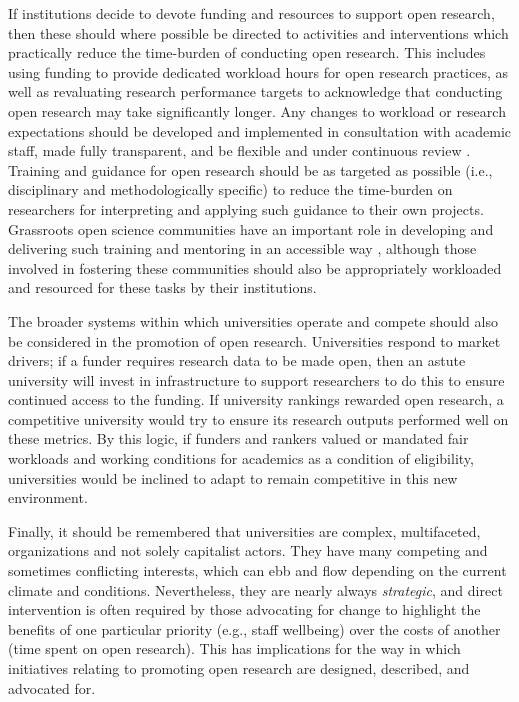 \documentclass[ authordate, meta, issue]{jote-new-article}
\begin{document}
If institutions decide to devote funding and resources to support open research, then these should where possible be directed to activities and interventions which practically reduce the time-burden of conducting open research. This includes using funding to provide dedicated workload hours for open research practices, as well as revaluating research performance targets to acknowledge that conducting open research may take significantly longer. Any changes to workload or research expectations should be developed and implemented in consultation with academic staff, made fully transparent, and be flexible and under continuous review \parencites{Kenny2022}. Training and guidance for open research should be as targeted as possible (i.e., disciplinary and methodologically specific) to reduce the time-burden on researchers for interpreting and applying such guidance to their own projects. Grassroots open science communities have an important role in developing and delivering such training and mentoring in an accessible way \parencites{Armeni2021}, although those involved in fostering these communities should also be appropriately workloaded and resourced for these tasks by their institutions.



The broader systems within which universities operate and compete should also be considered in the promotion of open research. Universities respond to market drivers; if a funder requires research data to be made open, then an astute university will invest in infrastructure to support researchers to do this to ensure continued access to the funding. If university rankings rewarded open research, a competitive university would try to ensure its research outputs performed well on these metrics. By this logic, if funders and rankers valued or mandated fair workloads and working conditions for academics as a condition of eligibility, universities would be inclined to adapt to remain competitive in this new environment.



Finally, it should be remembered that universities are complex, multifaceted, organizations and not solely capitalist actors. They have many competing and sometimes conflicting interests, which can ebb and flow depending on the current climate and conditions. Nevertheless, they are nearly always \emph{strategic}, and direct intervention is often required by those advocating for change to highlight the benefits of one particular priority (e.g., staff wellbeing) over the costs of another (time spent on open research). This has implications for the way in which initiatives relating to promoting open research are designed, described, and advocated for.
\end{document}
